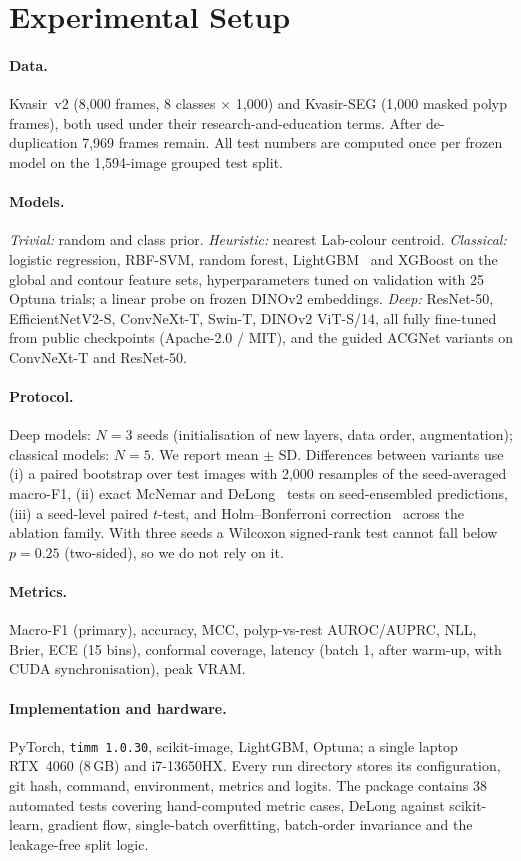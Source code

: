 \section{Experimental Setup}
\paragraph{Data.} Kvasir~v2 (8{,}000 frames, 8 classes $\times$ 1{,}000) and Kvasir-SEG (1{,}000 masked polyp frames), both used under their
research-and-education terms. After de-duplication 7{,}969 frames remain. All test numbers are computed once per frozen model on the
1{,}594-image grouped test split.

\paragraph{Models.} \emph{Trivial:} random and class prior. \emph{Heuristic:} nearest Lab-colour centroid.
\emph{Classical:} logistic regression, RBF-SVM, random forest, LightGBM~\cite{ke2017lightgbm} and XGBoost on
the global and contour feature sets, hyperparameters tuned on validation with 25 Optuna trials; a linear probe on frozen DINOv2 embeddings.
\emph{Deep:} ResNet-50, EfficientNetV2-S, ConvNeXt-T, Swin-T, DINOv2 ViT-S/14, all fully fine-tuned from public checkpoints (Apache-2.0 / MIT),
and the guided ACGNet variants on ConvNeXt-T and ResNet-50.

\paragraph{Protocol.} Deep models: $N{=}3$ seeds (initialisation of new layers, data order, augmentation); classical models: $N{=}5$.
We report mean $\pm$ SD. Differences between variants use (i) a paired bootstrap over test images with 2{,}000 resamples
of the seed-averaged macro-F1, (ii) exact McNemar and DeLong~\cite{delong1988,sun2014fastdelong} tests on seed-ensembled predictions,
(iii) a seed-level paired $t$-test, and Holm--Bonferroni correction~\cite{holm1979} across the ablation family.
With three seeds a Wilcoxon signed-rank test cannot fall below $p=0.25$ (two-sided), so we do not rely on it.

\paragraph{Metrics.} Macro-F1 (primary), accuracy, MCC, polyp-vs-rest AUROC/AUPRC, NLL, Brier, ECE (15 bins), conformal coverage,
latency (batch 1, after warm-up, with CUDA synchronisation), peak VRAM.

\paragraph{Implementation and hardware.} PyTorch, \texttt{timm~1.0.30}, scikit-image, LightGBM, Optuna; a single laptop
RTX~4060 (8\,GB) and i7-13650HX. Every run directory stores its configuration, git hash, command, environment, metrics and logits.
The package contains 38 automated tests covering hand-computed metric cases, DeLong against scikit-learn, gradient flow, single-batch overfitting,
batch-order invariance and the leakage-free split logic.
